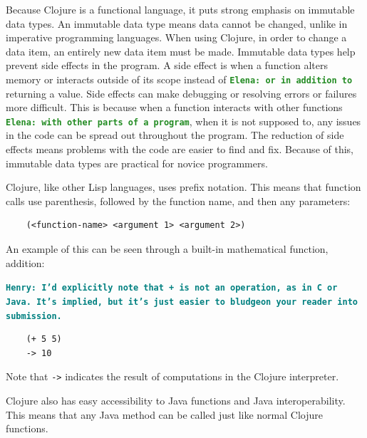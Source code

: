 \documentclass[12pt]{article}
\newcommand{\comment}[1]{{\bf \tt  {#1}}}
\newcommand{\emcomment}[1]{\textcolor{ForestGreen}{\comment{Elena: {#1}}}}
\newcommand{\hfcomment}[1]{\textcolor{Teal}{\comment{Henry: {#1}}}}
\begin{document}
Because Clojure is a functional language, it puts strong emphasis on
immutable data types. An immutable data type means data cannot 
be changed, unlike in %
  imperative programming languages. When using
Clojure, in order to change a data item, an entirely new data item
must be made. Immutable data types help prevent side effects in the program. 
A side effect is when a function alters memory
or interacts outside of its scope instead of \emcomment{or in addition to} returning a value. Side
effects can make debugging or resolving errors or failures more
difficult. This is because when a function interacts with other
functions \emcomment{with other parts of a program}, when it is not supposed to, any issues in the 
code can be spread out throughout the program. The reduction of side
effects means problems with the code are easier to find and fix.
Because of this, immutable data types are practical for novice
programmers.
 
Clojure, like other Lisp languages, uses prefix notation. This means
that function calls use parenthesis, followed by the function name,
and then any parameters: 
\begin{verbatim}
	(<function-name> <argument 1> <argument 2>)
\end{verbatim}

An example of this can be seen through a built-in mathematical function, addition:

\hfcomment{I'd explicitly note that + is not an operation, as in C or Java. It's implied, but it's just easier to bludgeon your reader into submission.}
\begin{verbatim}
	(+ 5 5)
	-> 10
\end{verbatim}

Note that \texttt{->} indicates the result of computations in the Clojure interpreter.

Clojure also has easy accessibility to Java functions and Java
interoperability. This means that any Java method can be called just
like normal Clojure functions.
\end{document}
